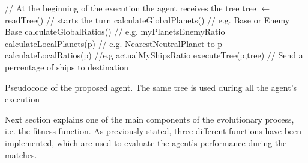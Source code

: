 \documentclass[preprint]{elsarticle}
\providecommand{\SetAlgoLined}{\SetLine}
\begin{document}
\begin{algorithm}[ht]
\begin{algorithmic}

\STATE // At the beginning of the execution the agent receives the tree
\STATE tree $\leftarrow$ readTree()
	\STATE // starts the turn
	\STATE calculateGlobalPlanets() // e.g. Base or Enemy Base
	\STATE calculateGlobalRatios() // e.g. myPlanetsEnemyRatio
		\STATE calculateLocalPlanets(p) // e.g. NearestNeutralPlanet to p
		\STATE calculateLocalRatios(p) //e.g actualMyShipsRatio
		\STATE executeTree(p,tree)  // Send a percentage of ships to destination
   \ENDFOR
\ENDWHILE

\end{algorithmic}
\caption{Pseudocode of the proposed agent. The same tree is used during all the agent's execution}
\label{alg:turn}
\end{algorithm}



	

Next section explains one of the main components of the evolutionary process, i.e. the fitness function. As previously stated, three different functions have been implemented, which are used to evaluate the agent's performance during the matches. 

\end{document}

